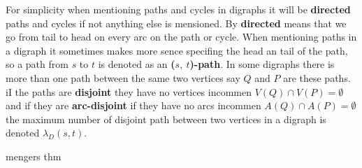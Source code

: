 For simplicity when mentioning paths and cycles in digraphs it will be \textbf{directed} paths and cycles if not anything else is mensioned. 
By \textbf{directed} means that we go from tail to head on every arc on the path or cycle.
When mentioning paths in a digraph it sometimes makes more sence specifing the head an tail of the path, so a path from $s$ to $t$ is denoted as an \textbf{($s,\ t$)-path}.
In some digraphs there is more than one path between the same two vertices say $Q$ and $P$ are these paths.
iI the paths are \textbf{disjoint} they have no vertices incommen $V(Q)\cap V(P)=\emptyset$ and if they are \textbf{arc-disjoint} if they have no arcs incommen $A(Q)\cap A(P)=\emptyset$ the maximum number of disjoint path between two vertices in a digraph is denoted $\lambda_D(s,t)$.
 

\begin{thm}
    mengers thm
\end{thm}

